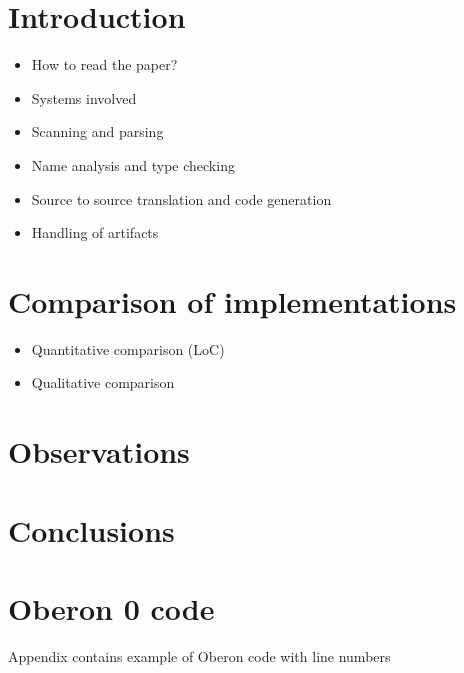 \documentclass[english,preprint,12pt]{elsarticle}
\begin{document}

\section{Introduction}
\label{sec:intro}

\begin{itemize}
\item How to read the paper?
\item Systems involved
\item Scanning and parsing
\item Name analysis and type checking
\item Source to source translation and code generation
\item Handling of artifacts
\end{itemize}












\section{Comparison of implementations}
\label{sec:comparison}
\begin{itemize}
\item Quantitative comparison (LoC)
\item Qualitative comparison
\end{itemize}

\section{Observations}
\label{sec:observations}

\section{Conclusions}
\label{sec:conclusions}



\appendix

\section{Oberon 0 code}
\label{sec:samples}
Appendix contains example of Oberon code with line numbers
\end{document}
